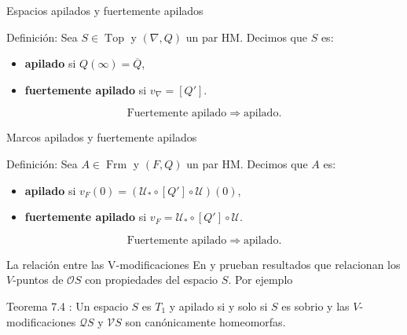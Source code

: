\documentclass[compress,12pt]{beamer}
\DeclareMathOperator{\Frm}{Frm}
\DeclareMathOperator{\Top}{Top}
\begin{document}
\begin{frame}{Espacios apilados y fuertemente apilados}
\begin{block}{Definición:}
Sea $S\in \Top$ y $(\nabla, Q)$ un par HM. Decimos que $S$ es:
\begin{itemize}
\item \textbf{apilado} si $Q(\infty)= \overline{Q}$,
\item \textbf{fuertemente apilado} si $v_\nabla=[Q']$.
\end{itemize}
\end{block}
\[
\text{Fuertemente apilado}\Rightarrow \text{apilado}.
\]
\end{frame}

\begin{frame}{Marcos apilados y fuertemente apilados}
\begin{block}{Definición:}
Sea $A\in \Frm$ y $(F, Q)$ un par HM. Decimos que $A$ es:
\begin{itemize}
\item \textbf{apilado} si $v_F(0)=(\mathcal{U}_*\circ [Q']\circ \mathcal{U})(0)$,
\item \textbf{fuertemente apilado} si $v_F=\mathcal{U}_*\circ [Q']\circ \mathcal{U}$.
\end{itemize}
\end{block}
\[
\text{Fuertemente apilado}\Rightarrow \text{apilado}.
\]
\end{frame}

\begin{frame}{La relación entre las V-modificaciones}
    En \cite{S.S.06} y \cite{H.S.V} prueban resultados que relacionan los $V$-puntos de $\mathcal{O}S$ con propiedades del espacio $S$. 
    Por ejemplo
    \begin{block}{Teorema 7.4 \cite{S.S.06}:}
        Un espacio $S$ es $T_1$ y apilado si y solo si $S$ es sobrio y las $V$-modificaciones $\mathcal{Q}S$ y $\mathcal{V}S$ son canónicamente 
        homeomorfas.

    \end{block}

\end{frame}
\end{document}
